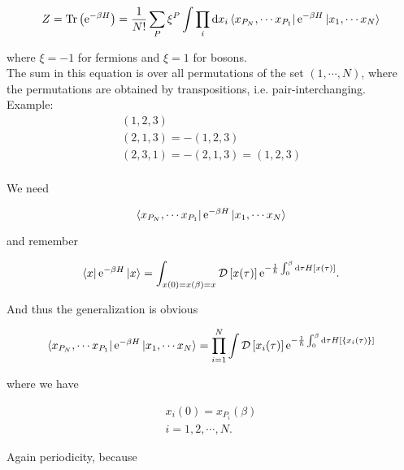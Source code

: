 \begin{equation*}
    Z = \Tr \left( \mathrm{e}^{-\beta H} \right) = \frac{1}{N!}\sum_{P} \xi^{P} \int \prod_{i} \dd x_{i} \bra{x_{P_{N}}, \cdots x_{P_{1}}} \mathrm{e}^{-\beta H} \ket{x_{1}, \cdots x_{N}}
\end{equation*}

where $\xi = -1$ for fermions and $\xi = 1$ for bosons. \\ 

The sum in this equation is over all permutations of the set $(1, \cdots ,N)$, where the permutations are obtained by transpositions, i.e. pair-interchanging. \\

Example: \\

\begin{align*}
    (1,2,3) \\ 
    (2,1,3) = -(1,2,3) \\
    (2,3,1) = -(2,1,3) = (1,2,3) \\ 
\end{align*}

We need 

\begin{equation*}
    \bra{x_{P_{N}}, \cdots x_{P_{1}}} \mathrm{e}^{-\beta H} \ket{x_{1}, \cdots x_{N}}
\end{equation*}

and remember 

\begin{equation*}
    \bra{x} \mathrm{e}^{-\beta H} \ket{x} = \int_{x(0) = x(\beta) = x} \mathcal{D} \left[x(\tau)\right] \mathrm{e}^{-\frac{1}{\hbar}\int_{0}^{\beta} \dd \tau H\left[x(\tau)\right]}.
\end{equation*}

And thus the generalization is obvious

\begin{equation}
    \bra{x_{P_{N}}, \cdots x_{P_{1}}} \mathrm{e}^{-\beta H} \ket{x_{1}, \cdots x_{N}} = \prod_{i=1}^{N}\int \mathcal{D} \left[x_{i}(\tau)\right] \mathrm{e}^{-\frac{1}{\hbar}\int_{0}^{\beta} \dd \tau H\left[\{x_{i}(\tau)\}\right]}
\end{equation}

where we have 

\begin{align*}
    x_{i}(0) = x_{P_{i}}(\beta) \\
    i = 1,2,\cdots, N. 
\end{align*}

Again periodicity, because 

